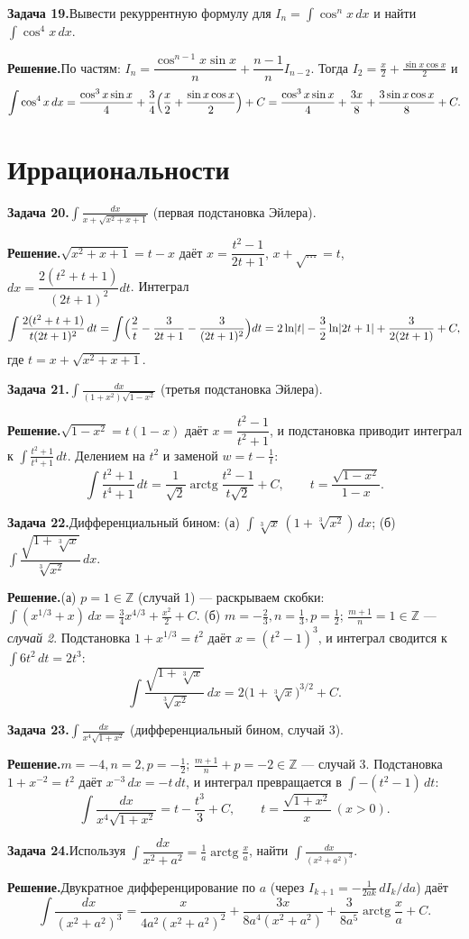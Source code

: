 \documentclass[10pt,a4paper]{article}
\DeclareMathOperator{\arctg}{arctg}
\newcommand{\Z}{\mathbb{Z}}
\newcommand{\dx}{\,dx}
\DeclarePairedDelimiter{\abs}{\lvert}{\rvert}
\theoremstyle{definition}
\theoremstyle{plain}
\newcommand{\writespace}{\vspace{7.5mm}}
\newcommand{\task}[2]{%
  \par\writespace\noindent
  \textbf{\textcolor{accent}{Задача #1.}}\enspace #2\par\smallskip}
\newcommand{\sol}{\par\noindent\textbf{Решение.}\enspace}
\begin{document}
\task{19}{Вывести рекуррентную формулу для $I_n=\int\cos^nx\dx$ и найти $\int\cos^4x\dx$.}
\sol По частям: $I_n=\dfrac{\cos^{n-1}x\sin x}{n}+\dfrac{n-1}{n}I_{n-2}$. Тогда $I_2=\tfrac x2+\tfrac{\sin x\cos x}{2}$ и
\[
  \int\cos^4x\dx=\frac{\cos^3x\sin x}{4}+\frac34\Bigl(\frac x2+\frac{\sin x\cos x}{2}\Bigr)+C
  =\frac{\cos^3x\sin x}{4}+\frac{3x}{8}+\frac{3\sin x\cos x}{8}+C.
\]

\section{Иррациональности}

\task{20}{$\displaystyle\int\frac{dx}{x+\sqrt{x^2+x+1}}$ (первая подстановка Эйлера).}
\sol $\sqrt{x^2+x+1}=t-x$ даёт $x=\dfrac{t^2-1}{2t+1}$, $x+\sqrt{\dots}=t$,
$dx=\dfrac{2(t^2+t+1)}{(2t+1)^2}dt$. Интеграл
\[
  \int\frac{2(t^2+t+1)}{t(2t+1)^2}\,dt=\int\Bigl(\frac2t-\frac3{2t+1}-\frac3{(2t+1)^2}\Bigr)dt
  =2\ln\abs t-\frac32\ln\abs{2t+1}+\frac{3}{2(2t+1)}+C,
\]
где $t=x+\sqrt{x^2+x+1}$.

\task{21}{$\displaystyle\int\frac{dx}{(1+x^2)\sqrt{1-x^2}}$ (третья подстановка Эйлера).}
\sol $\sqrt{1-x^2}=t(1-x)$ даёт $x=\dfrac{t^2-1}{t^2+1}$, и подстановка приводит интеграл к
$\displaystyle\int\frac{t^2+1}{t^4+1}\,dt$. Делением на $t^2$ и заменой $w=t-\tfrac1t$:
\[
  \int\frac{t^2+1}{t^4+1}\,dt=\frac1{\sqrt2}\arctg\frac{t^2-1}{t\sqrt2}+C,\qquad
  t=\frac{\sqrt{1-x^2}}{1-x}.
\]

\task{22}{Дифференциальный бином: (а) $\int\sqrt[3]{x}\,(1+\sqrt[3]{x^2})\dx$; (б) $\int\dfrac{\sqrt{1+\sqrt[3]{x}}}{\sqrt[3]{x^2}}\dx$.}
\sol (а) $p=1\in\Z$ (случай 1) — раскрываем скобки:
$\int(x^{1/3}+x)\dx=\tfrac34 x^{4/3}+\tfrac{x^2}{2}+C$.\;
(б) $m=-\tfrac23,n=\tfrac13,p=\tfrac12$; $\tfrac{m+1}{n}=1\in\Z$ — \emph{случай 2}. Подстановка
$1+x^{1/3}=t^2$ даёт $x=(t^2-1)^3$, и интеграл сводится к $\int6t^2\,dt=2t^3$:
\[
  \int\frac{\sqrt{1+\sqrt[3]{x}}}{\sqrt[3]{x^2}}\dx=2\bigl(1+\sqrt[3]{x}\bigr)^{3/2}+C.
\]

\task{23}{$\displaystyle\int\frac{dx}{x^4\sqrt{1+x^2}}$ (дифференциальный бином, случай 3).}
\sol $m=-4,n=2,p=-\tfrac12$; $\tfrac{m+1}{n}+p=-2\in\Z$ — случай 3. Подстановка $1+x^{-2}=t^2$ даёт
$x^{-3}\dx=-t\,dt$, и интеграл превращается в $\int-(t^2-1)\,dt$:
\[
  \int\frac{dx}{x^4\sqrt{1+x^2}}=t-\frac{t^3}{3}+C,\qquad t=\frac{\sqrt{1+x^2}}{x}\ (x>0).
\]

\task{24}{Используя $\int\dfrac{dx}{x^2+a^2}=\tfrac1a\arctg\tfrac xa$, найти $\displaystyle\int\frac{dx}{(x^2+a^2)^3}$.}
\sol Двукратное дифференцирование по $a$ (через $I_{k+1}=-\tfrac1{2ak}\,dI_k/da$) даёт
\[
  \int\frac{dx}{(x^2+a^2)^3}=\frac{x}{4a^2(x^2+a^2)^2}+\frac{3x}{8a^4(x^2+a^2)}
   +\frac{3}{8a^5}\arctg\frac xa+C.
\]
\end{document}
